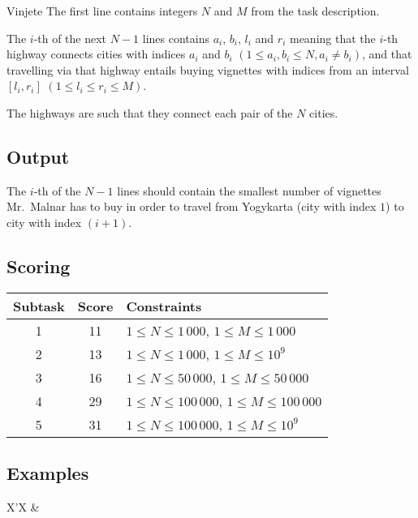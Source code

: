 \begin{statement}[
  problempoints=100,
  timelimit=3 seconds,
  memorylimit=512 MiB,
]{Vinjete}
The first line contains integers $N$ and $M$ from the task description.

The $i$-th of the next $N-1$ lines contains $a_i$, $b_i$, $l_i$ and $r_i$
meaning that the $i$-th highway connects cities with indices $a_i$ and $b_i$
$(1 \le a_i, b_i \le N, a_i \ne b_i)$, and that travelling via that highway
entails buying vignettes with indices from an interval $[l_i, r_i]$
$(1 \le l_i \le r_i \le M)$.

The highways are such that they connect each pair of the $N$ cities.

\subsection*{Output}

The $i$-th of the $N - 1$ lines should contain the smallest number of vignettes
Mr.\ Malnar has to buy in order to travel from Yogykarta (city with index $1$)
to city with index $(i + 1)$.

\subsection*{Scoring}

{\renewcommand{\arraystretch}{1.4}
  \setlength{\tabcolsep}{6pt}
  \begin{tabular}{ccl}
   Subtask & Score & Constraints \\ \midrule
    1 & 11 & $1 \le N \le 1\,000$, $1 \le M \le 1\,000$ \\
    2 & 13 & $1 \le N \le 1\,000$, $1 \le M \le 10^9$ \\
    3 & 16 & $1 \le N \le 50\,000$, $1 \le M \le 50\,000$\\
    4 & 29 & $1 \le N \le 100\,000$, $1 \le M \le 100\,000$\\
    5 & 31 & $1 \le N \le 100\,000$, $1 \le M \le 10^9$
\end{tabular}}

\subsection*{Examples}
\begin{tabularx}{\textwidth}{X'X}
 &
\end{tabularx}


\end{statement}
